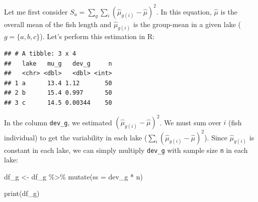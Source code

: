 \documentclass[
]{book}
\newenvironment{Shaded}{\begin{snugshade}}{\end{snugshade}}
\newcommand{\AttributeTok}[1]{\textcolor[rgb]{0.77,0.63,0.00}{#1}}
\newcommand{\CommentTok}[1]{\textcolor[rgb]{0.56,0.35,0.01}{\textit{#1}}}
\newcommand{\DecValTok}[1]{\textcolor[rgb]{0.00,0.00,0.81}{#1}}
\newcommand{\FunctionTok}[1]{\textcolor[rgb]{0.00,0.00,0.00}{#1}}
\newcommand{\NormalTok}[1]{#1}
\newcommand{\OtherTok}[1]{\textcolor[rgb]{0.56,0.35,0.01}{#1}}
\newcommand{\SpecialCharTok}[1]{\textcolor[rgb]{0.00,0.00,0.00}{#1}}
\begin{document}
Let me first consider \(S_a = \sum_g \sum_i (\hat{\mu}_{g(i)} - \hat{\mu})^2\). In this equation, \(\hat{\mu}\) is the overall mean of the fish length and \(\hat{\mu}_{g(i)}\) is the group-mean in a given lake (\(g = \{a, b, c\}\)). Let's perform this estimation in R:

\begin{Shaded}
\end{Shaded}

\begin{verbatim}
## # A tibble: 3 x 4
##   lake   mu_g   dev_g     n
##   <chr> <dbl>   <dbl> <int>
## 1 a      13.4 1.12       50
## 2 b      15.4 0.997      50
## 3 c      14.5 0.00344    50
\end{verbatim}

In the column \texttt{dev\_g}, we estimated \((\hat{\mu}_{g(i)} - \hat{\mu})^2\). We must sum over \(i\) (fish individual) to get the variability in each lake (\(\sum_i (\hat{\mu}_{g(i)} - \hat{\mu})^2\)). Since \(\hat{\mu}_{g(i)}\) is constant in each lake, we can simply multiply \texttt{dev\_g} with sample size \texttt{n} in each lake:

\begin{Shaded}
\begin{Highlighting}[]
\NormalTok{df\_g }\OtherTok{\textless{}{-}}\NormalTok{ df\_g }\SpecialCharTok{\%\textgreater{}\%} 
  \FunctionTok{mutate}\NormalTok{(}\AttributeTok{ss =}\NormalTok{ dev\_g }\SpecialCharTok{*}\NormalTok{ n)}

\FunctionTok{print}\NormalTok{(df\_g)}
\end{Highlighting}
\end{Shaded}
\end{document}
